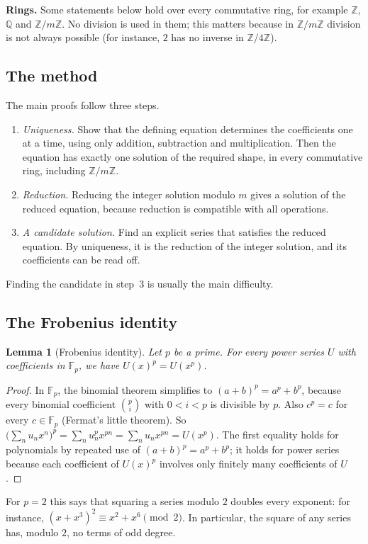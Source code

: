 \documentclass[11pt,a4paper]{article}
\newtheorem{lemma}[theorem]{Lemma}
\theoremstyle{definition}
\theoremstyle{remark}
\newcommand{\Z}{\mathbb{Z}}
\newcommand{\Q}{\mathbb{Q}}
\newcommand{\F}{\mathbb{F}}
\newcommand{\para}[1]{\par\medskip\noindent\textbf{#1}\enspace}
\begin{document}
\para{Rings.} Some statements below hold over every commutative ring, for example $\Z$, $\Q$ and $\Z/m\Z$. No
division is used in them; this matters because in $\Z/m\Z$ division is not always possible (for instance, $2$ has no inverse in
$\Z/4\Z$).

\subsection{The method}
The main proofs follow three steps.
\begin{enumerate}
\item \emph{Uniqueness.} Show that the defining equation determines the coefficients one at a time, using only
addition, subtraction and multiplication. Then the equation has exactly one solution of the required shape, in every
commutative ring, including $\Z/m\Z$.
\item \emph{Reduction.} Reducing the integer solution modulo $m$ gives a solution of the reduced equation,
because reduction is compatible with all operations.
\item \emph{A candidate solution.} Find an explicit series that satisfies the reduced equation. By uniqueness, it is
the reduction of the integer solution, and its coefficients can be read off.
\end{enumerate}
Finding the candidate in step~3 is usually the main difficulty.
\subsection{The Frobenius identity}
\begin{lemma}[Frobenius identity]\label{lem:frobenius}
Let $p$ be a prime. For every power series $U$ with coefficients in $\F_p$, we have $U(x)^p=U(x^p)$.
\end{lemma}

\begin{proof}
In $\F_p$, the binomial theorem simplifies to $(a+b)^p=a^p+b^p$, because every binomial coefficient
$\binom pi$ with $0<i<p$ is divisible by $p$. Also $c^p=c$ for every $c\in\F_p$ (Fermat's little theorem). So
$\bigl(\sum_nu_nx^n\bigr)^p=\sum_nu_n^px^{pn}=\sum_nu_nx^{pn}=U(x^p)$. The first equality holds for polynomials by
repeated use of $(a+b)^p=a^p+b^p$; it holds for power series because each coefficient of $U(x)^p$ involves only finitely
many coefficients of $U$.
\end{proof}

For $p=2$ this says that squaring a series modulo $2$ doubles every exponent: for instance,
$(x+x^3)^2\equiv x^2+x^6\pmod2$. In particular, the square of any series has, modulo $2$, no terms of odd degree.
\end{document}
